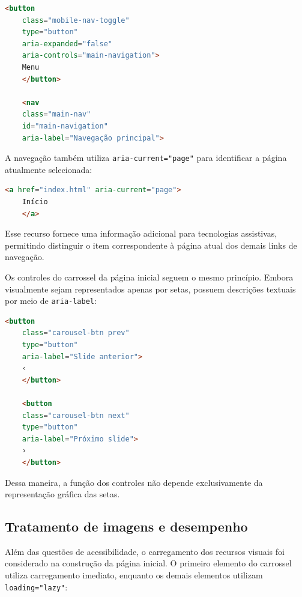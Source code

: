 \begin{lstlisting}[language=HTML, caption={Identificação do controle da navegação móvel.}, label={lst:mobilearia}]
	<button
	class="mobile-nav-toggle"
	type="button"
	aria-expanded="false"
	aria-controls="main-navigation">
	Menu
	</button>
	
	<nav
	class="main-nav"
	id="main-navigation"
	aria-label="Navegação principal">
\end{lstlisting}

A navegação também utiliza \texttt{aria-current="page"} para identificar a página atualmente selecionada:

\begin{lstlisting}[language=HTML, caption={Identificação da página atual na navegação.}, label={lst:ariacurrent}]
	<a href="index.html" aria-current="page">
	Início
	</a>
\end{lstlisting}

Esse recurso fornece uma informação adicional para tecnologias assistivas, permitindo distinguir o item correspondente à página atual dos demais links de navegação.

Os controles do carrossel da página inicial seguem o mesmo princípio. Embora visualmente sejam representados apenas por setas, possuem descrições textuais por meio de \texttt{aria-label}:

\begin{lstlisting}[language=HTML, caption={Controles acessíveis do carrossel.}, label={lst:carouselaria}]
	<button
	class="carousel-btn prev"
	type="button"
	aria-label="Slide anterior">
	‹
	</button>
	
	<button
	class="carousel-btn next"
	type="button"
	aria-label="Próximo slide">
	›
	</button>
\end{lstlisting}

Dessa maneira, a função dos controles não depende exclusivamente da representação gráfica das setas.

\vspace{5mm}
\subsection{Tratamento de imagens e desempenho}

Além das questões de acessibilidade, o carregamento dos recursos visuais foi considerado na construção da página inicial. O primeiro elemento do carrossel utiliza carregamento imediato, enquanto os demais elementos utilizam \texttt{loading="lazy"}:

